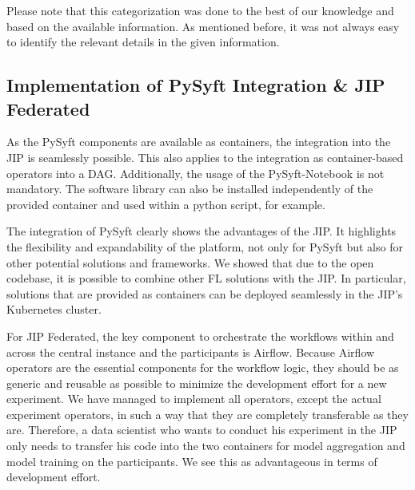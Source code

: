 Please note that this categorization was done to the best of our knowledge and based on the available information. As mentioned before, it was not always easy to identify the relevant details in the given information.





\subsection{Implementation of PySyft Integration \& JIP Federated}
\label{subsec:DiscussionImplementation}
As the PySyft components are available as containers, the integration into the JIP is seamlessly possible. This also applies to the integration as container-based operators into a DAG.
Additionally, the usage of the PySyft-Notebook is not mandatory. The software library can also be installed independently of the provided container and used within a python script, for example.

The integration of PySyft clearly shows the advantages of the JIP. 
It highlights the flexibility and expandability of the platform, not only for PySyft but also for other potential solutions and frameworks. We showed that due to the open codebase, it is possible to combine other FL solutions with the JIP. In particular, solutions that are provided as containers can be deployed seamlessly in the JIP's Kubernetes cluster.

For JIP Federated, the key component to orchestrate the workflows within and across the central instance and the participants is Airflow.
Because Airflow operators are the essential components for the workflow logic, they should be as generic and reusable as possible to minimize the development effort for a new experiment. We have managed to implement all operators, except the actual experiment operators, in such a way that they are completely transferable as they are. Therefore, a data scientist who wants to conduct his experiment in the JIP only needs to transfer his code into the two containers for model aggregation and model training on the participants. We see this as advantageous in terms of development effort.

